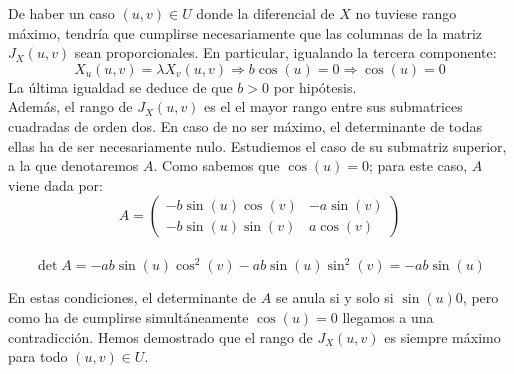 \documentclass{article}
\begin{document}
\vspace{2mm{}}
De haber un caso $(u, v) \in U$ donde la diferencial de $X$ no tuviese rango
máximo, tendría que cumplirse necesariamente que las columnas de la matriz
$J_X(u,v)$ sean proporcionales. En particular, igualando la tercera componente:
$$X_u(u,v) = \lambda X_v(u,v) \Rightarrow b \cos(u) = 0 \Rightarrow \cos(u) = 0 $$
\noindent La última igualdad se deduce de que $b > 0$ por hipótesis. \\

Además, el rango de $J_X(u,v)$ es el el mayor rango entre sus submatrices cuadradas
de orden dos. En caso de no ser máximo, el determinante de todas ellas ha de ser
necesariamente nulo. Estudiemos el caso de su submatriz superior,
a la que denotaremos $A$. Como sabemos que $\cos(u) = 0$; para este caso,
$A$ viene dada por: \\
\[
A =
\begin{pmatrix}
-b \sin(u) \cos(v) & -a \sin(v)\\[2ex]
-b \sin(u) \sin(v) & a \cos(v)
\end{pmatrix}
\]
\\
$$
\det{A} = -ab \sin(u) \cos^2(v) - a b \sin(u)\sin^2(v) = 
 -a b \sin(u)
$$

\vspace{2mm}
En estas condiciones, el determinante de $A$ se anula si y solo
si $\sin(u) 0$, pero como ha de cumplirse simultáneamente
$\cos(u) = 0$ llegamos a una contradicción. Hemos demostrado que
el rango de $J_X(u, v)$ es siempre máximo para todo $(u,v) \in U$.
\end{document}
